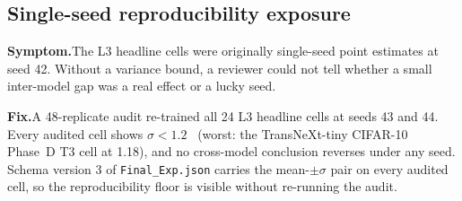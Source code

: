 \subsection{Single-seed reproducibility exposure}
\textbf{Symptom.}\quad The L3 headline cells were originally single-seed
point estimates at seed 42. Without a variance bound, a reviewer could not
tell whether a small inter-model gap was a real effect or a lucky seed.

\textbf{Fix.}\quad A 48-replicate audit re-trained all 24 L3 headline cells
at seeds 43 and 44. Every audited cell shows $\sigma < 1.2$~\Mpp{} (worst:
the TransNeXt-tiny CIFAR-10 Phase~D T3 cell at 1.18), and no cross-model
conclusion reverses under any seed. Schema version 3 of
\texttt{Final\_Exp.json} carries the mean-$\pm\sigma$ pair on every audited
cell, so the reproducibility floor is visible without re-running the audit.
